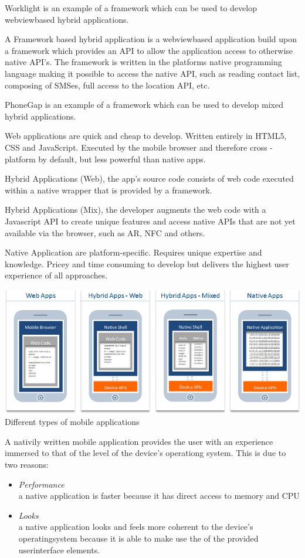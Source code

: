 Worklight is an example of a framework which can be used to develop webviewbased hybrid applications.

A Framework based hybrid application is a webviewbased application build upon a framework which provides an API to allow the application access to otherwise native API's. The framework is written in the platforms native programming language making it possible to access the native API, such as reading contact list, composing of SMSes, full access to the location API, etc.

PhoneGap is an example of a framework which can be used to develop mixed hybrid applications.

Web applications are quick and cheap to develop. Written entirely in HTML5, CSS and JavaScript. Executed by the mobile
browser and therefore cross - platform by default, but less powerful than native apps.
 
Hybrid Applications (Web), the app's source code consists of web code executed within a native wrapper that is provided by a framework.
 
Hybrid Applications (Mix), the developer augments the web code with a Javascript API to create unique features and
access native APIs that are not yet available via the browser, such as AR, NFC and others.
 
Native Application are platform-specific. Requires unique expertise and knowledge. Pricey and time consuming to develop but
 delivers the highest user experience of all approaches.

\begin{centering}
\includegraphics[scale=0.5]{images/apptypesdefined.png}\\{Different types of mobile applications\cite{IBM-Worklight2012}}\\
\end{centering}

A nativily written mobile application provides the user with an experience immersed to that of the level of the device's operationg system. This is due to two reasons:
\begin{itemize}
\item
\emph{Performance}\\
a native application is faster because it has direct access to memory and CPU
\item \emph{Looks}\\
a native application looks and feels more coherent to the device's operatingsystem because it is able to make use the of the provided userinterface elements.
\end{itemize}
